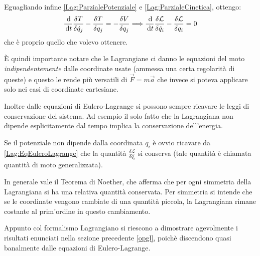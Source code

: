 \documentclass[../main.tex]{subfiles}
\begin{document}
Eguagliando infine \cref{Lag:ParzialePotenziale} e \cref{Lag:ParzialeCinetica}, ottengo:
\begin{equation*}
	\frac{\,\mathrm{d}}{\,\mathrm{d} t}\frac{\delta T}{\delta \dot q_j} - \frac{\delta T}{\delta q_j}=-\frac{\delta V}{\delta q_j} \Longrightarrow \frac{\,\mathrm{d}}{\,\mathrm{d} t} \frac{\delta \mathcal L}{\delta \dot q_i} - \frac{\delta \mathcal L}{\delta q_i}=0
\end{equation*}
che è proprio quello che volevo ottenere.

È quindi importante notare che le Lagrangiane ci danno le equazioni del moto \emph{indipendentemente} dalle coordinate usate (ammessa una certa regolarità di queste) e questo le rende più versatili di $\vec F=m\vec a$ che invece si poteva applicare solo nei casi di coordinate cartesiane.

Inoltre dalle equazioni di Eulero-Lagrange si possono sempre ricavare le leggi di conservazione del sistema. Ad esempio il solo fatto che la Lagrangiana non dipende esplicitamente dal tempo implica la conservazione dell'energia.

Se il potenziale non dipende dalla coordinata $q_i$ è ovvio ricavare da \cref{Lag:EqEuleroLagrange} che la quantità $\frac{\delta \mathcal L}{\delta \dot q_i}$ si conserva (tale quantità è chiamata quantità di moto generalizzata).

In generale vale il Teorema di Noether, che afferma che per ogni simmetria della Lagrangiana si ha una relativa quantità conservata. Per simmetria si intende che se le coordinate vengono cambiate di una quantità piccola, la Lagrangiana rimane costante al prim'ordine in questo cambiamento.

Appunto col formalismo Lagrangiano si riescono a dimostrare agevolmente i risultati enunciati nella sezione precedente \cref{opgl}, poichè discendono quasi banalmente dalle equazioni di Eulero-Lagrange.
\end{document}
